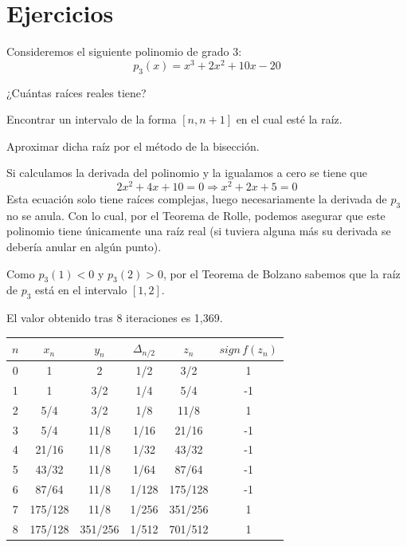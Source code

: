     \section{Ejercicios}
    \begin{ejer}
    Consideremos el siguiente polinomio de grado $3$:
    $$p_3(x)=x^3+2x^2+10x-20$$
    \item[a)]¿Cuántas raíces reales tiene?
    \item[b)] Encontrar un intervalo de la forma $[n,n+1]$ en el cual esté la raíz.
    \item[c)] Aproximar dicha raíz por el método de la bisección.
    \end{ejer}
    \begin{sol}
    \item[a)] Si calculamos la derivada del polinomio y la igualamos a cero se tiene que
    $$2x^2+4x+10=0\Longrightarrow x^2+2x+5=0$$
    Esta ecuación solo tiene raíces complejas, luego necesariamente la derivada de $p_3$ no se anula. Con lo cual, por el Teorema de Rolle, podemos asegurar que este polinomio tiene únicamente una raíz real (si tuviera alguna más su derivada se debería anular en algún punto).
    \item[b)] Como $p_3(1)<0$ y $p_3(2)>0$, por el Teorema de Bolzano sabemos que la raíz de $p_3$ está en el intervalo $[1,2]$.
    
\item[c)] El valor obtenido tras $8$ iteraciones es 1,369.

    
\begin{center}
\begin{tabular}{|c|c|c|c|c|c|}
\hline
$n$ & $x_n$    & $y_n$    & $\Delta_{n/2}$ & $z_n$    & $sign\,f(z_n)$ \\
\hline
0 & 1       & 2       & 1/2                        & 3/2     & 1                             \\
1 & 1       & 3/2     & 1/4                        & 5/4     & -1                            \\
2 & 5/4     & 3/2     & 1/8                        & 11/8    & 1                             \\
3 & 5/4     & 11/8    & 1/16                       & 21/16   & -1                            \\
4 & 21/16   & 11/8    & 1/32                       & 43/32   & -1                            \\
5 & 43/32   & 11/8    & 1/64                       & 87/64   & -1                            \\
6 & 87/64   & 11/8    & 1/128                      & 175/128 & -1                            \\
7 & 175/128 & 11/8    & 1/256                      & 351/256 & 1                             \\
8 & 175/128 & 351/256 & 1/512                      & 701/512 & 1    \\
\hline
\end{tabular}
\end{center}
    \end{sol}
